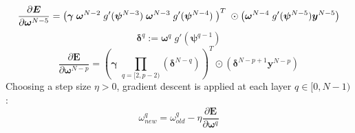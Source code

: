 \documentclass{article}
\begin{document}
%
\begin{equation} \label{eq:derive_du_nm5_matrix}
\frac{\partial \bm{E}}{\partial \bm{\omega}^{N-5}} =
\left(
\bm{\gamma} \;
\bm{\omega}^{N-2} \;
g' (\bm{\psi}^{N-3}) \;
\bm{\omega}^{N-3} \;
g' (\bm{\psi}^{N-4}) \;
\right)^T \;
\odot
\left(
\bm{\omega}^{N-4} \;
g' (\bm{\psi}^{N-5})
\bm{y}^{N-5} \\
\right)
\end{equation}
%
\begin{equation} \label{eq:delta}
\bm{\delta}^q := \bm{\omega}^q \; g' \left( \bm{\psi}^{q-1} \right)
\end{equation}
%
\begin{equation} \label{eq:derive_du_nm5_matrix_delta}
\frac{\partial \bm{E}}{\partial \bm{\omega}^{N-p}} =
\left(
\bm{\gamma} \;
\prod_{q=[2,p-2)}
\left( \bm{\delta}^{N-q} \right)
\right)^T
\odot
\left(
\bm{\delta}^{N-p+1}
\bm{y}^{N-p}
\right)
\end{equation}
%
Choosing a step size $\eta > 0$, gradient descent is applied at each layer $q \in [0, N-1)$:
%
\begin{equation} \label{eq:end_weights}
\omega_{new}^q = \omega_{old}^q - \eta
\frac{\partial \bm{E}}{\partial \bm{\omega}^q}
\end{equation}
%
\end{document}
